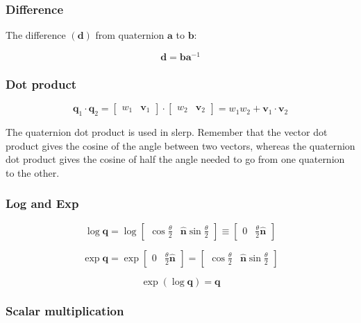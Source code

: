 \documentclass[a4paper,11pt]{article}
\begin{document}
\subsubsection{Difference}

The difference $(\textbf{d})$ from quaternion $\textbf{a}$ to $\textbf{b}$:

$$
\textbf{d}=\textbf{b}\textbf{a}^{-1}
$$

\subsubsection{Dot product}

$$
\textbf{q}_1\cdot\textbf{q}_2=\begin{bmatrix}
	w_1 & \textbf{v}_1
\end{bmatrix}\cdot\begin{bmatrix}
	w_2 & \textbf{v}_2
\end{bmatrix}=
w_1w_2+\textbf{v}_1\cdot\textbf{v}_2
$$

The quaternion dot product is used in slerp. Remember that the vector dot product gives the cosine of the angle between two vectors, whereas the quaternion dot product gives the cosine of half the angle needed to go from one quaternion to the other.

\subsubsection{Log and Exp}

$$\log\textbf{q}=\log\begin{bmatrix}
\cos\frac{\theta}{2} & \hat{\textbf{n}}\sin\frac{\theta}{2}\end{bmatrix}\equiv
\begin{bmatrix}0 & \frac{\theta}{2}\hat{\textbf{n}}\end{bmatrix}$$

$$\exp\textbf{q}=\exp\begin{bmatrix}0 & \frac{\theta}{2}\hat{\textbf{n}}\end{bmatrix}=
\begin{bmatrix}\cos\frac{\theta}{2} & \hat{\textbf{n}}\sin\frac{\theta}{2}\end{bmatrix}
$$

$$\exp(\log\textbf{q})=\textbf{q}$$

\subsubsection{Scalar multiplication}
\end{document}
